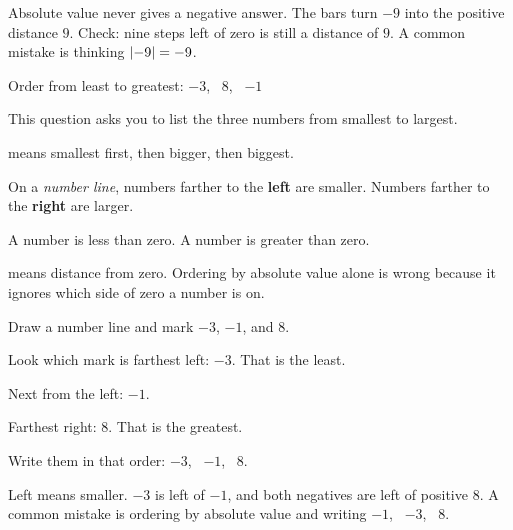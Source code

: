 

\noindent Absolute value never gives a negative answer. The bars turn $-9$ into
the positive distance $9$. Check: nine steps left of zero is still a distance of
$9$. A common mistake is thinking $\left\lvert -9 \right\rvert = -9$.


\noindent Order from least to greatest: $-3$, \ $8$, \ $-1$


\noindent This question asks you to list the three numbers from smallest to
largest.

\begin{words}
  \item {}means smallest first, then bigger, then biggest.
  \item On a \textit{number line}, numbers farther to the \textbf{left} are smaller. Numbers farther
        to the \textbf{right} are larger.
  \item A number is less than zero. A number is greater than zero.
  \item {}means distance from zero. Ordering by absolute value alone is wrong
        because it ignores which side of zero a number is on.
\end{words}

\begin{steps}
  \item Draw a number line and mark $-3$, $-1$, and $8$.
  \item Look which mark is farthest left: $-3$. That is the least.
  \item Next from the left: $-1$.
  \item Farthest right: $8$. That is the greatest.
  \item Write them in that order: $-3$, \ $-1$, \ $8$.
\end{steps}



\noindent Left means smaller. $-3$ is left of $-1$, and both negatives are left
of positive $8$. A common mistake is ordering by absolute value and writing
$-1$, \ $-3$, \ $8$.

